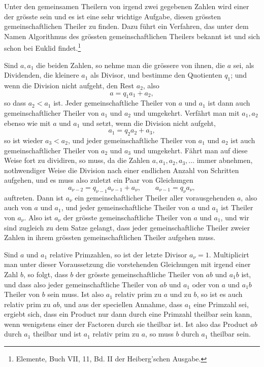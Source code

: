 \documentclass[11pt]{article}
\begin{document}
Unter den gemeinsamen Theilern von irgend zwei gegebenen Zahlen wird einer der grösste sein und es ist eine sehr wichtige Aufgabe, diesen grössten gemeinschaftlichen Theiler zu finden. Dazu führt ein Verfahren, das unter dem Namen Algorithmus des grössten gemeinschaftlichen Theilers bekannt ist und sich schon bei Euklid findet.\footnote{Elemente, Buch VII, 11, Bd. II der Heiberg'schen Ausgabe.}

Sind $a,a_1$ die beiden Zahlen, so nehme man die grössere von ihnen, die $a$ sei, als Dividenden, die kleinere $a_1$ als Divisor, und bestimme den Quotienten $q_1$; und wenn die Division nicht aufgeht, den Rest $a_2$, also
\[
  a=q_1a_1+a_2,
\]
so dass $a_2<a_1$ ist. Jeder gemeinschaftliche Theiler von $a$ und $a_1$ ist dann auch gemeinschaftlicher Theiler von $a_1$ und $a_2$ und umgekehrt. Verfährt man mit $a_1,a_2$ ebenso wie mit $a$ und $a_1$ und setzt, wenn die Division nicht aufgeht,
\[
  a_1=q_2a_2+a_3,
\]
so ist wieder $a_3<a_2$, und jeder gemeinschaftliche Theiler von $a_1$ und $a_2$ ist auch gemeinschaftlicher Theiler von $a_2$ und $a_3$ und umgekehrt. Fährt man auf diese Weise fort zu dividiren, so muss, da die Zahlen $a,a_1,a_2,a_3,\ldots$ immer abnehmen, nothwendiger Weise die Division nach einer endlichen Anzahl von Schritten aufgehen, und es muss also zuletzt ein Paar von Gleichungen
\[
  a_{\nu-2}=q_{\nu-1}a_{\nu-1}+a_\nu,
  \qquad
  a_{\nu-1}=q_\nu a_\nu,
\]
auftreten. Dann ist $a_\nu$ ein gemeinschaftlicher Theiler aller vorausgehenden $a$, also auch von $a$ und $a_1$, und jeder gemeinschaftliche Theiler von $a$ und $a_1$ ist Theiler von $a_\nu$. Also ist $a_\nu$ der grösste gemeinschaftliche Theiler von $a$ und $a_1$, und wir sind zugleich zu dem Satze gelangt, dass jeder gemeinschaftliche Theiler zweier Zahlen in ihrem grössten gemeinschaftlichen Theiler aufgehen muss.

Sind $a$ und $a_1$ relative Primzahlen, so ist der letzte Divisor $a_\nu=1$. Multiplicirt man unter dieser Voraussetzung die vorstehenden Gleichungen mit irgend einer Zahl $b$, so folgt, dass $b$ der grösste gemeinschaftliche Theiler von $ab$ und $a_1b$ ist, und dass also jeder gemeinschaftliche Theiler von $ab$ und $a_1$ oder von $a$ und $a_1b$ Theiler von $b$ sein muss. Ist also $a_1$ relativ prim zu $a$ und zu $b$, so ist es auch relativ prim zu $ab$, und aus der speciellen Annahme, dass $a_1$ eine Primzahl sei, ergiebt sich, dass ein Product nur dann durch eine Primzahl theilbar sein kann, wenn wenigstens einer der Factoren durch sie theilbar ist. Ist also das Product $ab$ durch $a_1$ theilbar und ist $a_1$ relativ prim zu $a$, so muss $b$ durch $a_1$ theilbar sein.
\end{document}
